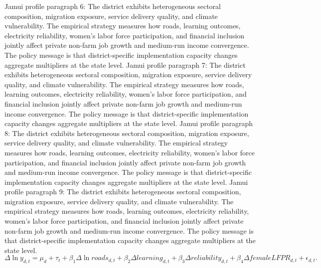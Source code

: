 \documentclass[preprint,12pt]{elsarticle}
\begin{document}
Jamui profile paragraph 6: The district exhibits heterogeneous sectoral composition, migration exposure, service delivery quality, and climate vulnerability. The empirical strategy measures how roads, learning outcomes, electricity reliability, women's labor force participation, and financial inclusion jointly affect private non-farm job growth and medium-run income convergence. The policy message is that district-specific implementation capacity changes aggregate multipliers at the state level.
Jamui profile paragraph 7: The district exhibits heterogeneous sectoral composition, migration exposure, service delivery quality, and climate vulnerability. The empirical strategy measures how roads, learning outcomes, electricity reliability, women's labor force participation, and financial inclusion jointly affect private non-farm job growth and medium-run income convergence. The policy message is that district-specific implementation capacity changes aggregate multipliers at the state level.
Jamui profile paragraph 8: The district exhibits heterogeneous sectoral composition, migration exposure, service delivery quality, and climate vulnerability. The empirical strategy measures how roads, learning outcomes, electricity reliability, women's labor force participation, and financial inclusion jointly affect private non-farm job growth and medium-run income convergence. The policy message is that district-specific implementation capacity changes aggregate multipliers at the state level.
Jamui profile paragraph 9: The district exhibits heterogeneous sectoral composition, migration exposure, service delivery quality, and climate vulnerability. The empirical strategy measures how roads, learning outcomes, electricity reliability, women's labor force participation, and financial inclusion jointly affect private non-farm job growth and medium-run income convergence. The policy message is that district-specific implementation capacity changes aggregate multipliers at the state level.
\begin{equation}\Delta \ln y_{d,t}=\mu_d+\tau_t+\beta_1\Delta\ln roads_{d,t}+\beta_2\Delta learning_{d,t}+\beta_3\Delta reliability_{d,t}+\beta_4\Delta femaleLFPR_{d,t}+\epsilon_{d,t}.\end{equation}
\end{document}
